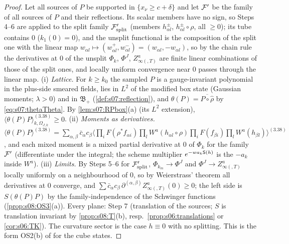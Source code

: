 \begin{proof}
Let all sources of $P$ be supported in $\{x_\nu\ge c+\delta\}$ and let $\mathcal F'$ be the family of all sources of $P$ and their reflections. Its scalar members have no sign, so Steps 4--6 are applied to the split family $\mathcal F'_{\rm split}$ (members $h^\pm_{\alpha l}$, $h^\pm_{\alpha l}\circ\rho$, all $\ge0$); its tube contains $0$ ($k_1(0)=0$), and the unsplit functional is the composition of the split one with the linear map $w_{\alpha l}\mapsto(w^+_{\alpha l},w^-_{\alpha l})=(w_{\alpha l},-w_{\alpha l})$, so by the chain rule the derivatives at $0$ of the unsplit $\Phi_k$, $\Phi^J$, $Z^a_{\infty(,T)}$ are finite linear combinations of those of the split ones, and locally uniform convergence near $0$ passes through the linear map. (i) \emph{Lattice.} For $k\ge k_0$ the sampled $P$ is a gauge-invariant polynomial in the plus-side smeared fields, lies in $L^2$ of the modified box state (Gaussian moments; $\lambda>0$) and in $\mathfrak B_+$ (\cref{def:s07:reflection}), and $\theta(P)=\overline{P\circ\hat\rho}$ by \eqref{eq:s07:thetaTheta}. By \cref{lem:s07:RPbox}(a) (its $L^2$ extension), $\langle\theta(P)P\rangle^{(3.38)}_{k,\Omega_{J,k}}\ge0$. (ii) \emph{Moments as derivatives.} $\langle\theta(P)P\rangle^{(3.38)}=\sum_{\alpha,\beta}\bar c_\alpha c_\beta\langle\prod_iF(\rho^*f_{\alpha i})\prod_lW^a(h_{\alpha l}\circ\rho)\prod_iF(f_{\beta i})\prod_lW^a(h_{\beta l})\rangle^{(3.38)}$, and each mixed moment is a mixed partial derivative at $0$ of $\Phi_k$ for the family $\mathcal F'$ (differentiate under the integral; the scheme multiplier $e^{-wa_k\mathsf S(h)}$ is the $-a_k$ inside $W^a$). (iii) \emph{Limits.} By Steps 5--6 for $\mathcal F'_{\rm split}$, $\Phi_{k_m}\to\Phi^J$ and $\Phi^J\to Z^a_{\infty(,T)}$ locally uniformly on a neighbourhood of $0$, so by Weierstrass' theorem all derivatives at $0$ converge, and $\sum\bar c_\alpha c_\beta\,\partial^{(\alpha,\beta)}Z^a_{\infty(,T)}(0)\ge0$; the left side is $S(\theta(P)P)$ by the family-independence of the Schwinger functions (\cref{prop:s08:OS3}(a)). Every plane: Step 7 (translation of the sources; $S$ is translation invariant by \cref{prop:s08:T}(b), resp.\ \cref{prop:s06:translations} or \cref{cor:s06:TK}). The curvature sector is the case $h\equiv0$ with no splitting. This is the form OS2(b) of \cite[Def.~2.10, Thm.~9.4]{SymPhase} for the cube states.
\end{proof}

